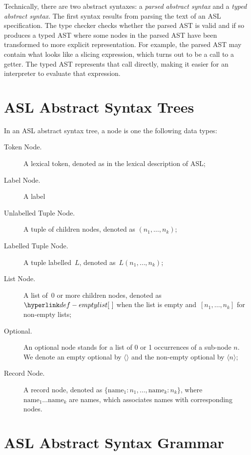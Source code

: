 \documentclass{book}
\begin{document}
Technically, there are two abstract syntaxes:
a \emph{parsed abstract syntax} and a \emph{typed abstract syntax}.
The first syntax results from parsing the text of an ASL specification.
The type checker checks whether the parsed AST is valid and if so produces
a typed AST where some nodes in the parsed AST have been transformed to
more explicit representation. For example, the parsed AST may contain
what looks like a slicing expression, which turns out to be a call to a getter.
The typed AST represents that call directly, making it easier for an interpreter
to evaluate that expression.

\section{ASL Abstract Syntax Trees}

In an ASL abstract syntax tree, a node is one the following data types:
\begin{description}
\item[Token Node.] A lexical token, denoted as in the lexical description of ASL;
\item[Label Node.] A label
\item[Unlabelled Tuple Node.] A tuple of children nodes, denoted as $(n_1,\ldots,n_k)$;
\item[Labelled Tuple Node.] A tuple labelled~$L$, denoted as~$L(n_1,\ldots,n_k)$;
\item[List Node.] A list of~$0$ or more children nodes, denoted as~$\emptylist$
      when the list is empty and~$[n_1,\ldots,n_k]$ for non-empty lists;
\item[Optional.] An optional node stands for a list of 0 or 1 occurrences of a sub-node $n$. We denote an empty optional by $\langle\rangle$ and the non-empty optional by $\langle n \rangle$;
\item[Record Node.] A record node, denoted as $\{\text{name}_1 : n_1,\ldots,\text{name}_k : n_k\}$, where \\
      $\text{name}_1 \ldots \text{name}_k$ are names, which associates names with corresponding nodes.
\end{description}

\newpage

\section{ASL Abstract Syntax Grammar}
\end{document}
